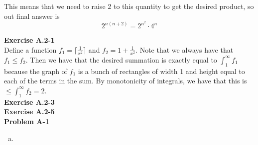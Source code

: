 \documentclass{article}
\begin{document}
This means that we need to raise 2 to this quantity to get the desired product, so out final answer is
\[
2^{n(n+2)} = 2^{n^2} \cdot 4^n
\]

\noindent\textbf{Exercise A.2-1}\\
Define a function $f_1 = \lceil \frac{1}{x^2} \rceil$ and $f_2 = 1+ \frac{1}{x^2}$. Note that we always have that $f_1 \le f_2$. Then we have that the desired summation is exactly equal to $\int_1^\infty f_1$ because the graph of $f_1$ is a bunch of rectangles of width 1 and height equal to each of the terms in the sum. By monotonicity of integrals, we have that this is $ \le \int_1^\infty f_2 =2$. \\

\noindent\textbf{Exercise A.2-3}\\


\noindent\textbf{Exercise A.2-5}\\

\noindent\textbf{Problem A-1}\\
\begin{enumerate}[a.]
\item

\end{enumerate}
\end{document}

